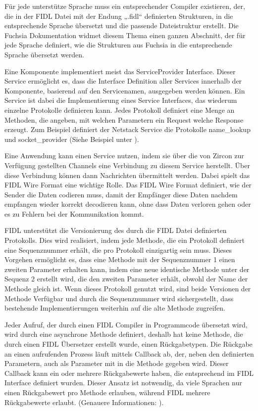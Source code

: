 \documentclass[a4paper]{scrartcl}
\begin{document}
Für jede unterstütze Sprache muss ein entsprechender Compiler existieren, der, die in der FIDL Datei mit der Endung „.fidl“ definierten Strukturen, in die entsprechende Sprache übersetzt und die passende Dateistruktur erstellt. Die Fuchsia Dokumentation widmet diesem Thema einen ganzen Abschnitt, der für jede Sprache definiert, wie die Strukturen aus Fuchsia in die entsprechende Sprache übersetzt werden. \cite{Fuchsia.FIDLBindings.Overview}

Eine Komponente implementiert meist das ServiceProvider Interface. Dieser Service ermöglicht es, dass die Interface Definition aller Services innerhalb der Komponente, basierend auf den Servicenamen, ausgegeben werden können. Ein Service ist dabei die Implementierung eines Service Interfaces, das wiederum einzelne Protokolle definieren kann. Jedes Protokoll definiert eine Menge an Methoden, die angeben, mit welchen Parametern ein Request welche Response erzeugt.  Zum Beispiel definiert der Netstack Service die Protokolle name\_lookup und socket\_provider (Siehe Beispiel unter \cite{Fuchsia.Components.Servies}).

Eine Anwendung kann einen Service nutzen, indem sie über die von Zircon zur Verfügung gestellten Channels eine Verbindung zu diesem Service herstellt. Über diese Verbindung können dann Nachrichten übermittelt werden. Dabei spielt das FIDL Wire Format eine wichtige Rolle. Das FIDL Wire Format definiert, wie der Sender die Daten codieren muss, damit der Empfänger diese Daten nachdem empfangen wieder korrekt decodieren kann, ohne dass Daten verloren gehen oder es zu Fehlern bei der Kommunikation kommt.

FIDL unterstützt die Versionierung des durch die FIDL Datei definierten Protokolls. Dies wird realisiert, indem jede Methode, die ein Protokoll definiert eine Sequenznummer erhält, die pro Protokoll einzigartig sein muss. Dieses Vorgehen ermöglicht es, dass eine Methode mit der Sequenznummer 1 einen zweiten Parameter erhalten kann, indem eine neue identische Methode unter der Sequenz 2 erstellt wird, die den zweiten Parameter erhält, obwohl der Name der Methode gleich ist. Wenn dieses Protokoll genutzt wird, sind beide Versionen der Methode Verfügbar und durch die Sequenznummer wird sichergestellt, dass bestehende Implementierungen weiterhin auf die alte Methode zugreifen. \cite{Fuchsia.FIDL.Tutorial}

Jeder Aufruf, der durch einen FIDL Compiler in Programmcode übersetzt wird, wird durch eine asynchrone Methode definiert, deshalb hat keine Methode, die durch einen FIDL Übersetzer erstellt wurde, einen Rückgabetypen. Die Rückgabe an einen aufrufenden Prozess läuft mittels Callback ab, der, neben den definierten Parametern, auch als Parameter mit in die Methode gegeben wird. Dieser Callback kann ein oder mehrere Rückgabewerte haben, die entsprechend im FIDL Interface definiert wurden. Dieser Ansatz ist notwendig, da viele Sprachen nur einen Rückgabewert pro Methode erlauben, während FIDL mehrere Rückgabewerte erlaubt. (Genauere Informationen: \cite{Fuchsia.FIDL.Tutorial}).
\end{document}

